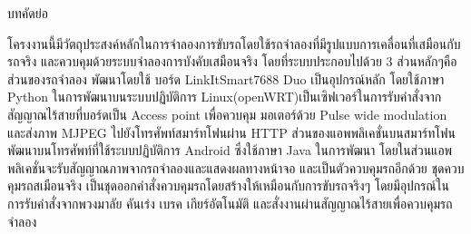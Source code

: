 บทคัดย่อ

โครงงานนี้มีวัตถุประสงค์หลักในการจำลองการขับรถโดยใช้รถจำลองที่มีรูปแบบการเคลื่อนที่เสมือนกับรถจริง และควบคุมด้วยระบบจำลองการบังคับเสมือนจริง โดยที่ระบบประกอบไปด้วย 3 ส่วนหลักๆคือ 
ส่วนของรถจำลอง พัฒนาโดยใช้ บอร์ด LinkItSmart7688 Duo เป็นอุปกรณ์หลัก โดยใช้ภาษา Python ในการพัฒนาบนระบบปฏิบัติการ Linux(openWRT)เป็นเซิฟเวอร์ในการรับคำสั่งจากสัญญาณไร้สายที่บอร์ดเป็น Access point 
เพื่อควบคุม มอเตอร์ด้วย Pulse wide modulation และส่งภาพ MJPEG ไปยังโทรศัพท์สมาร์ทโฟนผ่าน HTTP ส่วนของแอพพลิเคชั่นบนสมาร์ทโฟน 
พัฒนาบนโทรศัพท์ที่ใช้ระบบปฏิบัติการ Android ซึ่งใช้ภาษา Java ในการพัฒนา โดยในส่วนแอพพลิเคชั่นจะรับสัญญาณภาพจากรถจำลองและแสดงผลทางหน้าจอ และเป็นตัวควบคุมรถอีกด้วย 
ชุดควบคุมรถสเมือนจริง เป็นชุดออกคำสั่งควบคุมรถโดยสร้างให้เหมือนกับการขับรถจริงๆ โดยมีอุปกรณ์ในการรับคำสั่งจากพวงมาลัย คันเร่ง เบรค เกียร์อัตโนมัติ และสั่งงานผ่านสัญญาณไร้สายเพื่อควบคุมรถจำลอง

